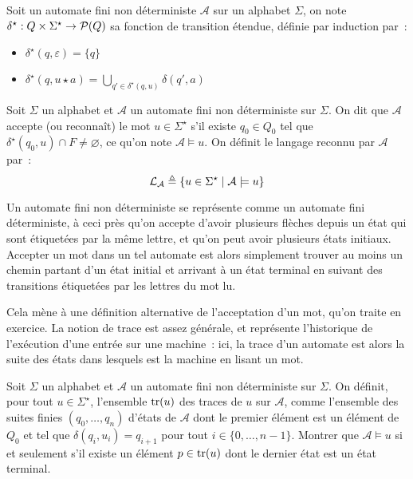 \begin{definition}
  Soit un automate fini non déterministe $\mathcal A$ sur un alphabet $\Sigma$,
  on note $\delta^\star : Q \times \Sigma^\star \to \mathcal{P}(Q)$ sa fonction de
  transition étendue, définie par induction par~:
  \begin{itemize}
  \item $\delta^\star(q,\varepsilon) = \{q\}$
  \item $\displaystyle\delta^\star(q,u\star a) =
    \bigcup_{q' \in \delta^\star(q,u)} \delta(q',a)$
  \end{itemize}
\end{definition}

\begin{definition}
  Soit $\Sigma$ un alphabet et $\mathcal A$ un automate fini non déterministe
  sur $\Sigma$. On dit que $\mathcal A$ accepte (ou reconnaît) le mot
  $u \in \Sigma^\star$ s'il existe $q_0 \in Q_0$ tel que
  $\delta^\star(q_0,u) \cap F\neq\varnothing$, ce qu'on note
  $\mathcal A \models u$.
  On définit le langage reconnu par $\mathcal A$ par~:
  \[\mathcal L_\mathcal A\triangleq \{u \in \Sigma^\star \mid \mathcal A \models u\}\]
\end{definition}

Un automate fini non déterministe se représente comme un automate fini
déterministe, à ceci près qu'on accepte d'avoir plusieurs flèches depuis un
état qui sont étiquetées par la même lettre, et qu'on peut avoir plusieurs
états initiaux. Accepter un mot dans un tel automate est alors simplement
trouver au moins un chemin partant d'un état initial et arrivant à un état
terminal en suivant des transitions étiquetées par les lettres du mot lu.

Cela mène à une définition alternative de l'acceptation d'un mot, qu'on traite
en exercice. La notion de trace est assez générale, et représente l'historique
de l'exécution d'une entrée sur une machine~: ici, la trace d'un automate est
alors la suite des états dans lesquels est la machine en lisant un mot.

\begin{exercise}\label{exo.traces.auto}
  Soit $\Sigma$ un alphabet et $\mathcal A$ un automate fini non déterministe
  sur $\Sigma$. On définit, pour tout $u \in \Sigma^\star$, l'ensemble $\operatorname{tr}(u)$
  des traces de $u$ sur $\mathcal A$, comme l'ensemble des suites finies
  $(q_0,\ldots,q_n)$ d'états de $\mathcal A$ dont le premier élément est un
  élément de $Q_0$ et tel que $\delta(q_i,u_i) = q_{i+1}$ pour tout
  $i \in \{0,\ldots,n-1\}$. Montrer que $\mathcal A \models u$ si et seulement
  s'il existe un élément $p \in \operatorname{tr}(u)$ dont le dernier état est un état
  terminal.
\end{exercise}

